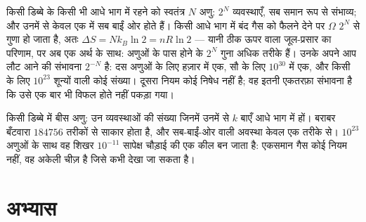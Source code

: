 \begin{example}[गैस लौटकर क्यों नहीं आती]\label{ex:b1:second-law-entropy:count}
किसी डिब्बे के किसी भी आधे भाग में रहने को स्वतंत्र $N$ अणु: $2^N$
व्यवस्थाएँ, सब समान रूप से संभाव्य; और उनमें से केवल एक में सब बाईं ओर
होते हैं। किसी आधे भाग में बंद गैस को फैलने देने पर $\Omega$ $2^N$ से गुणा
हो जाता है, अतः $\Delta S =
Nk_B\ln2 = nR\ln2$ --- यानी ठीक ऊपर वाला जूल-प्रसार का परिणाम, पर अब एक
अर्थ के साथ: अणुओं के पास होने के $2^N$ गुना अधिक तरीके हैं। उनके अपने आप
लौट आने की संभावना $2^{-N}$ है: दस अणुओं के लिए हज़ार में एक, सौ के लिए
$10^{30}$ में एक, और किसी  के लिए $10^{23}$ शून्यों वाली कोई संख्या।
दूसरा नियम कोई निषेध नहीं है; वह इतनी एकतरफ़ा संभावना है कि उसे एक बार भी
विफल होते नहीं पकड़ा गया।
\end{example}

\begin{omfigure}

{\small किसी डिब्बे में बीस अणु: उन व्यवस्थाओं की संख्या जिनमें उनमें से
$k$ बाएँ आधे भाग में हों। बराबर बँटवारा $184756$ तरीकों से साकार होता है,
और सब-बाईं-ओर वाली अवस्था केवल एक तरीके से। $10^{23}$ अणुओं के साथ वह
शिखर $10^{-11}$ सापेक्ष चौड़ाई की एक कील बन जाता है: एकसमान गैस कोई नियम
नहीं, वह अकेली चीज़ है जिसे कभी देखा जा सकता है।}
\end{omfigure}

\section{अभ्यास}

